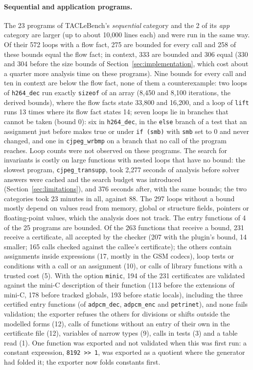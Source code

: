\documentclass[oneside,english]{amsart}
\numberwithin{equation}{section}
\numberwithin{figure}{section}
\theoremstyle{plain}
\theoremstyle{definition}
\theoremstyle{plain}
\theoremstyle{remark}
\theoremstyle{plain}
\theoremstyle{definition}
\theoremstyle{plain}
\theoremstyle{remark}
\begin{document}
\paragraph{Sequential and application programs.}
The 23 programs of TACLeBench's \emph{sequential} category and the 2 of its \emph{app} category are larger (up to about 10{,}000 lines each) and were run in the same way. Of their 572 loops with a flow fact, 275 are bounded for every call and 258 of these bounds equal the flow fact; in context, 333 are bounded and 306 equal (330 and 304 before the size bounds of Section~\ref{sec:implementation}, which cost about a quarter more analysis time on these programs). Nine bounds for every call and ten in context are below the flow fact, none of them a counterexample: two loops of \texttt{h264\_dec} run exactly \texttt{sizeof} of an array (8{,}450 and 8{,}100 iterations, the derived bounds), where the flow facts state 33{,}800 and 16{,}200, and a loop of \texttt{lift} runs 13 times where its flow fact states 14; seven loops lie in branches that cannot be taken (bound $0$): six in \texttt{h264\_dec}, in the \texttt{else} branch of a test that an assignment just before makes true or under \texttt{if (smb)} with \texttt{smb} set to 0 and never changed, and one in \texttt{cjpeg\_wrbmp} on a branch that no call of the program reaches. Loop counts were not observed on these programs. The search for invariants is costly on large functions with nested loops that have no bound: the slowest program, \texttt{cjpeg\_transupp}, took 2{,}277 seconds of analysis before solver answers were cached and the search budget was introduced (Section~\ref{sec:limitations}), and 376 seconds after, with the same bounds; the two categories took 23 minutes in all, against 88. The 297 loops without a bound mostly depend on values read from memory, global or structure fields, pointers or floating-point values, which the analysis does not track. The entry functions of 4 of the 25 programs are bounded. Of the 263 functions that receive a bound, 231 receive a certificate, all accepted by the checker (207 with the plugin's bound, 14 smaller; 165 calls checked against the callee's certificate); the others contain assignments inside expressions (17, mostly in the GSM codecs), loop tests or conditions with a call or an assignment (10), or calls of library functions with a trusted cost (5). With the option \texttt{minic}, 194 of the 231 certificates are validated against the mini-C description of their function (113 before the extensions of mini-C, 178 before tracked globals, 193 before static locals), including the three certified entry functions (of \texttt{adpcm\_dec}, \texttt{adpcm\_enc} and \texttt{petrinet}), and none fails validation; the exporter refuses the others for divisions or shifts outside the modelled forms (12), calls of functions without an entry of their own in the certificate file (12), variables of narrow types (9), calls in tests (3) and a table read (1). One function was exported and not validated when this was first run: a constant expression, \texttt{8192 >> 1}, was exported as a quotient where the generator had folded it; the exporter now folds constants first.
\end{document}
